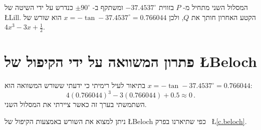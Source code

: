 המסלול השני מתחיל מ-%
$P$
בזווית 
$-37.4537^\circ$
ומשתקף ב-%
$\pm 90^\circ$
כנדרש על ידי השיטה של
\L{Lill}.
הקטע האחרון חותך את
$Q$,
ולכן
$x=-\tan -37.4537^\circ=0.766044$
הוא שורש של
$4x^3-3x+\frac{1}{2}$.



\section{פתרון המשוואה על ידי הקיפול של
\L{Beloch}}

בתיאור לעיל רימיתי כי ידעתי ששורש המשוואה הוא
$x=-\tan -37.4537^\circ=0.766044$:
\[
4(0.766044)^3-3(0.766044)+0.5\approx 0\,.
\]
השתמשתי בערך זה כאשר ציירתי את המסלול השני. 

ניתן למצוא את השורש באמצעות הקיפול של 
\L{Beloch}
כפי שתיארנו בפרק~%
\L{\ref{c.beloch}}.

